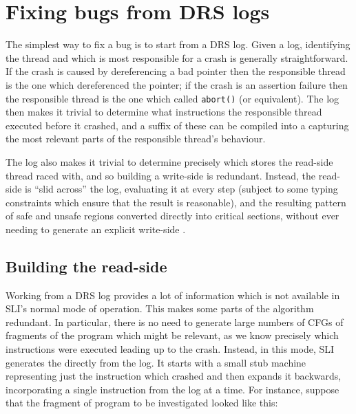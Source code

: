 
\section{Fixing bugs from DRS logs}
\label{sect:fix_from_drs}
The simplest way to fix a bug is to start from a DRS log.
Given a log, identifying the thread and which is most responsible for a crash is generally straightforward.
If the crash is caused by dereferencing a bad pointer then the responsible thread is the one which dereferenced the pointer; if the crash is an assertion failure then the responsible thread is the one which called \verb|abort()| (or equivalent).
The log then makes it trivial to determine what instructions the responsible thread executed before it crashed, and a suffix of these can be compiled into a \StateMachine capturing the most relevant parts of the responsible thread's behaviour.

The log also makes it trivial to determine precisely which stores the read-side thread raced with, and so building a write-side \StateMachine is redundant.
Instead, the read-side \StateMachine is ``slid across'' the log, evaluating it at every step (subject to some typing constraints which ensure that the result is reasonable), and the resulting pattern of safe and unsafe regions converted directly into critical sections, without ever needing to generate an explicit write-side \StateMachines.

\subsection{Building the read-side \StateMachine}

Working from a DRS log provides a lot of information which is not available in SLI's normal mode of operation.
This makes some parts of the algorithm redundant.
In particular, there is no need to generate large numbers of CFGs of fragments of the program which might be relevant, as we know precisely which instructions were executed leading up to the crash.
Instead, in this mode, SLI generates the \StateMachine directly from the log.
It starts with a small stub machine representing just the instruction which crashed and then expands it backwards, incorporating a single instruction from the log at a time.
For instance, suppose that the fragment of program to be investigated looked like this:

